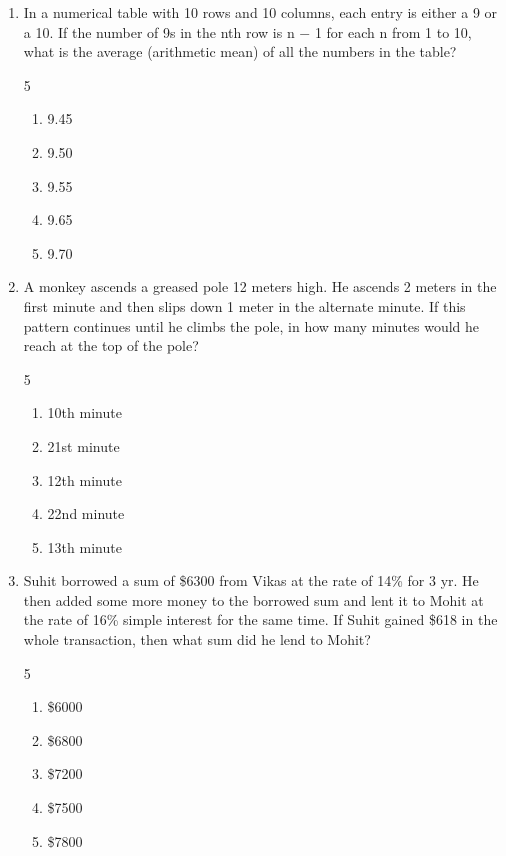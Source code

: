\documentclass[12pt]{article}
\begin{document}
\begin{enumerate}
\item In a numerical table with 10 rows and 10 columns, each entry is either a 9 or a 10. If the number of 9s in the nth row is n $-$ 1 for each n from 1 to 10, what is the average (arithmetic mean) of all the numbers in the table?
\begin{multicols}{5}
\begin{enumerate}[label=(\Alph*)]
\item 9.45
\item 9.50
\item 9.55
\item 9.65
\item 9.70
\end{enumerate}
\end{multicols}

\item A monkey ascends a greased pole 12 meters high. He ascends 2 meters in the first minute and then slips down 1 meter in the alternate minute. If this pattern continues until he climbs the pole, in how many minutes would he reach at the top of the pole?
\begin{multicols}{5}
\begin{enumerate}[label=(\Alph*)]
\item 10th minute
\item 21st minute
\item 12th minute
\item 22nd minute
\item 13th minute
\end{enumerate}
\end{multicols}

\item Suhit borrowed a sum of \$6300 from Vikas at the rate of 14\% for 3 yr. He then added some more money to the borrowed sum and lent it to Mohit at the rate of 16\% simple interest for the same time. If Suhit gained \$618 in the whole transaction, then what sum did he lend to Mohit?
\begin{multicols}{5}
\begin{enumerate}[label=(\Alph*)]
\item \$6000
\item \$6800
\item \$7200
\item \$7500
\item \$7800
\end{enumerate}
\end{multicols}


\end{enumerate}
\end{document}

